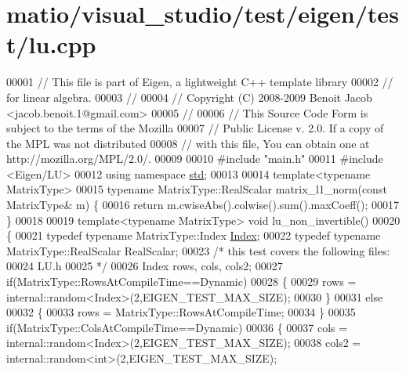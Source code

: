 \hypertarget{matio_2visual__studio_2test_2eigen_2test_2lu_8cpp_source}{}\section{matio/visual\+\_\+studio/test/eigen/test/lu.cpp}
\label{matio_2visual__studio_2test_2eigen_2test_2lu_8cpp_source}

\begin{DoxyCode}
00001 \textcolor{comment}{// This file is part of Eigen, a lightweight C++ template library}
00002 \textcolor{comment}{// for linear algebra.}
00003 \textcolor{comment}{//}
00004 \textcolor{comment}{// Copyright (C) 2008-2009 Benoit Jacob <jacob.benoit.1@gmail.com>}
00005 \textcolor{comment}{//}
00006 \textcolor{comment}{// This Source Code Form is subject to the terms of the Mozilla}
00007 \textcolor{comment}{// Public License v. 2.0. If a copy of the MPL was not distributed}
00008 \textcolor{comment}{// with this file, You can obtain one at http://mozilla.org/MPL/2.0/.}
00009 
00010 \textcolor{preprocessor}{#include "main.h"}
00011 \textcolor{preprocessor}{#include <Eigen/LU>}
00012 \textcolor{keyword}{using namespace }\hyperlink{namespacestd}{std};
00013 
00014 \textcolor{keyword}{template}<\textcolor{keyword}{typename} MatrixType>
00015 \textcolor{keyword}{typename} MatrixType::RealScalar matrix\_l1\_norm(\textcolor{keyword}{const} MatrixType& m) \{
00016   \textcolor{keywordflow}{return} m.cwiseAbs().colwise().sum().maxCoeff();
00017 \}
00018 
00019 \textcolor{keyword}{template}<\textcolor{keyword}{typename} MatrixType> \textcolor{keywordtype}{void} lu\_non\_invertible()
00020 \{
00021   \textcolor{keyword}{typedef} \textcolor{keyword}{typename} MatrixType::Index \hyperlink{namespace_eigen_a62e77e0933482dafde8fe197d9a2cfde}{Index};
00022   \textcolor{keyword}{typedef} \textcolor{keyword}{typename} MatrixType::RealScalar RealScalar;
00023   \textcolor{comment}{/* this test covers the following files:}
00024 \textcolor{comment}{     LU.h}
00025 \textcolor{comment}{  */}
00026   Index rows, cols, cols2;
00027   \textcolor{keywordflow}{if}(MatrixType::RowsAtCompileTime==Dynamic)
00028   \{
00029     rows = internal::random<Index>(2,EIGEN\_TEST\_MAX\_SIZE);
00030   \}
00031   \textcolor{keywordflow}{else}
00032   \{
00033     rows = MatrixType::RowsAtCompileTime;
00034   \}
00035   \textcolor{keywordflow}{if}(MatrixType::ColsAtCompileTime==Dynamic)
00036   \{
00037     cols = internal::random<Index>(2,EIGEN\_TEST\_MAX\_SIZE);
00038     cols2 = internal::random<int>(2,EIGEN\_TEST\_MAX\_SIZE);

\end{DoxyCode}
